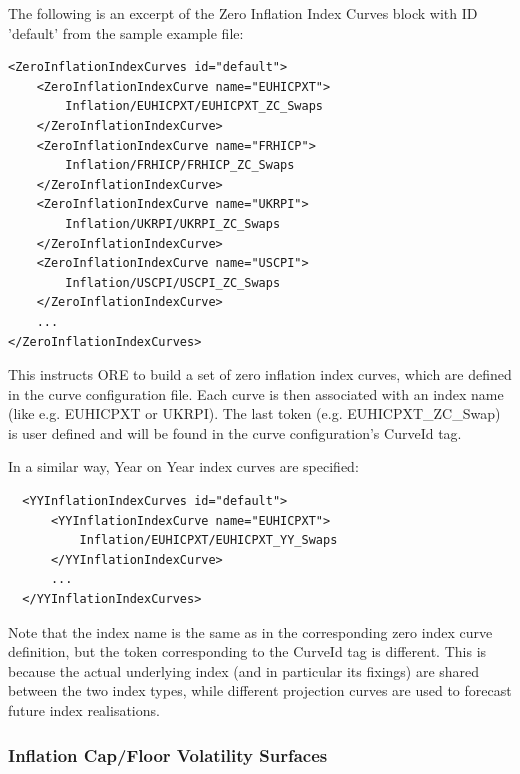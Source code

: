 The following is an excerpt of the Zero Inflation Index Curves block with ID 'default' from the sample example file:

\begin{listing}[H]
\begin{verbatim}
<ZeroInflationIndexCurves id="default">
    <ZeroInflationIndexCurve name="EUHICPXT">
        Inflation/EUHICPXT/EUHICPXT_ZC_Swaps
    </ZeroInflationIndexCurve>
    <ZeroInflationIndexCurve name="FRHICP">
        Inflation/FRHICP/FRHICP_ZC_Swaps
    </ZeroInflationIndexCurve>
    <ZeroInflationIndexCurve name="UKRPI">
        Inflation/UKRPI/UKRPI_ZC_Swaps
    </ZeroInflationIndexCurve>
    <ZeroInflationIndexCurve name="USCPI">
        Inflation/USCPI/USCPI_ZC_Swaps
    </ZeroInflationIndexCurve>
    ...
</ZeroInflationIndexCurves>
\end{verbatim}
\caption{Zero Inflation Index Curves block with ID 'default'}
\label{lst:zeroinflationindexcurve_spec}
\end{listing}

This instructs ORE to build a set of zero inflation index curves, which are defined in the curve configuration
file. Each curve is then associated with an index name (like e.g. EUHICPXT or UKRPI). The last token
(e.g. EUHICPXT\_ZC\_Swap) is user defined and will be found in the curve configuration's CurveId tag.

In a similar way, Year on Year index curves are specified:

\begin{listing}[H]
\begin{verbatim}
  <YYInflationIndexCurves id="default">
      <YYInflationIndexCurve name="EUHICPXT">
          Inflation/EUHICPXT/EUHICPXT_YY_Swaps
      </YYInflationIndexCurve>
      ...
  </YYInflationIndexCurves>
\end{verbatim}
\caption{YoY Inflation Index Curves block with ID 'default'}
\label{lst:yoyinflationindexcurve_spec}
\end{listing}

Note that the index name is the same as in the corresponding zero index curve definition, but the token corresponding to
the CurveId tag is different. This is because the actual underlying index (and in particular its fixings) are shared
between the two index types, while different projection curves are used to forecast future index realisations.

\subsubsection{Inflation Cap/Floor Volatility Surfaces}


